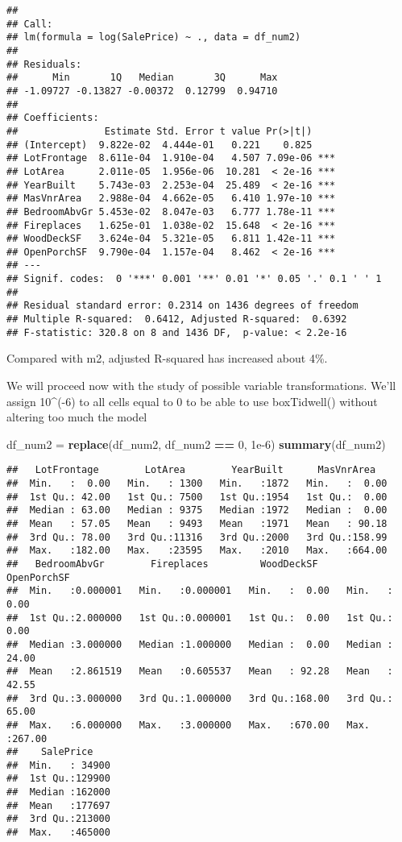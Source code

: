 \documentclass[
]{article}
\newenvironment{Shaded}{\begin{snugshade}}{\end{snugshade}}
\newcommand{\DecValTok}[1]{\textcolor[rgb]{0.00,0.00,0.81}{#1}}
\newcommand{\FloatTok}[1]{\textcolor[rgb]{0.00,0.00,0.81}{#1}}
\newcommand{\FunctionTok}[1]{\textcolor[rgb]{0.13,0.29,0.53}{\textbf{#1}}}
\newcommand{\NormalTok}[1]{#1}
\newcommand{\OtherTok}[1]{\textcolor[rgb]{0.56,0.35,0.01}{#1}}
\newcommand{\SpecialCharTok}[1]{\textcolor[rgb]{0.81,0.36,0.00}{\textbf{#1}}}
\begin{document}
\begin{verbatim}
## 
## Call:
## lm(formula = log(SalePrice) ~ ., data = df_num2)
## 
## Residuals:
##      Min       1Q   Median       3Q      Max 
## -1.09727 -0.13827 -0.00372  0.12799  0.94710 
## 
## Coefficients:
##               Estimate Std. Error t value Pr(>|t|)    
## (Intercept)  9.822e-02  4.444e-01   0.221    0.825    
## LotFrontage  8.611e-04  1.910e-04   4.507 7.09e-06 ***
## LotArea      2.011e-05  1.956e-06  10.281  < 2e-16 ***
## YearBuilt    5.743e-03  2.253e-04  25.489  < 2e-16 ***
## MasVnrArea   2.988e-04  4.662e-05   6.410 1.97e-10 ***
## BedroomAbvGr 5.453e-02  8.047e-03   6.777 1.78e-11 ***
## Fireplaces   1.625e-01  1.038e-02  15.648  < 2e-16 ***
## WoodDeckSF   3.624e-04  5.321e-05   6.811 1.42e-11 ***
## OpenPorchSF  9.790e-04  1.157e-04   8.462  < 2e-16 ***
## ---
## Signif. codes:  0 '***' 0.001 '**' 0.01 '*' 0.05 '.' 0.1 ' ' 1
## 
## Residual standard error: 0.2314 on 1436 degrees of freedom
## Multiple R-squared:  0.6412, Adjusted R-squared:  0.6392 
## F-statistic: 320.8 on 8 and 1436 DF,  p-value: < 2.2e-16
\end{verbatim}

Compared with m2, adjusted R-squared has increased about 4\%.

We will proceed now with the study of possible variable transformations.
We'll assign 10\^{}(-6) to all cells equal to 0 to be able to use
boxTidwell() without altering too much the model

\begin{Shaded}
\begin{Highlighting}[]
\NormalTok{df\_num2 }\OtherTok{=} \FunctionTok{replace}\NormalTok{(df\_num2, df\_num2 }\SpecialCharTok{==} \DecValTok{0}\NormalTok{, }\FloatTok{1e{-}6}\NormalTok{)}
\FunctionTok{summary}\NormalTok{(df\_num2)}
\end{Highlighting}
\end{Shaded}

\begin{verbatim}
##   LotFrontage        LotArea        YearBuilt      MasVnrArea    
##  Min.   :  0.00   Min.   : 1300   Min.   :1872   Min.   :  0.00  
##  1st Qu.: 42.00   1st Qu.: 7500   1st Qu.:1954   1st Qu.:  0.00  
##  Median : 63.00   Median : 9375   Median :1972   Median :  0.00  
##  Mean   : 57.05   Mean   : 9493   Mean   :1971   Mean   : 90.18  
##  3rd Qu.: 78.00   3rd Qu.:11316   3rd Qu.:2000   3rd Qu.:158.99  
##  Max.   :182.00   Max.   :23595   Max.   :2010   Max.   :664.00  
##   BedroomAbvGr        Fireplaces         WoodDeckSF      OpenPorchSF    
##  Min.   :0.000001   Min.   :0.000001   Min.   :  0.00   Min.   :  0.00  
##  1st Qu.:2.000000   1st Qu.:0.000001   1st Qu.:  0.00   1st Qu.:  0.00  
##  Median :3.000000   Median :1.000000   Median :  0.00   Median : 24.00  
##  Mean   :2.861519   Mean   :0.605537   Mean   : 92.28   Mean   : 42.55  
##  3rd Qu.:3.000000   3rd Qu.:1.000000   3rd Qu.:168.00   3rd Qu.: 65.00  
##  Max.   :6.000000   Max.   :3.000000   Max.   :670.00   Max.   :267.00  
##    SalePrice     
##  Min.   : 34900  
##  1st Qu.:129900  
##  Median :162000  
##  Mean   :177697  
##  3rd Qu.:213000  
##  Max.   :465000
\end{verbatim}
\end{document}
